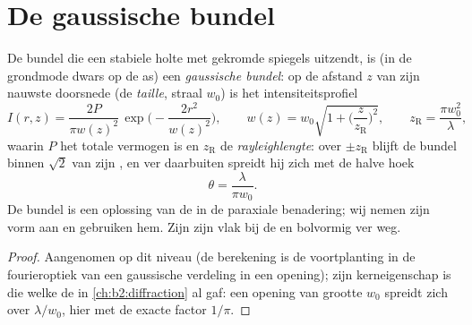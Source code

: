 \section{De gaussische bundel}

\begin{proposition}\label{prop:b2:laser:gaussian}
De bundel die een stabiele holte met gekromde spiegels uitzendt, is (in de
grondmode dwars op de as) een \emph{gaussische bundel}: op de afstand $z$ van zijn nauwste doorsnede (de
\emph{taille}, straal $w_0$) is het
intensiteitsprofiel
\[
I(r,z) = \frac{2P}{\pi w(z)^2}\,\exp\Big(-\frac{2r^2}{w(z)^2}\Big),
\qquad
w(z) = w_0\sqrt{1 + \Big(\frac{z}{z_{\text{R}}}\Big)^2},
\qquad
z_{\text{R}} = \frac{\pi w_0^2}{\lambda},
\]
waarin $P$ het totale vermogen is en $z_{\text{R}}$ de
\emph{rayleighlengte}: over $\pm z_{\text{R}}$ blijft de bundel
binnen $\sqrt2$ van zijn , en ver daarbuiten spreidt hij zich met de
halve hoek
\[
\theta = \frac{\lambda}{\pi w_0} .
\]
De bundel is een oplossing van de  in de paraxiale
benadering; wij nemen zijn vorm aan en gebruiken hem. Zijn  zijn vlak bij
de  en bolvormig ver weg.
\end{proposition}

\begin{proof}
Aangenomen op dit niveau (de berekening is de voortplanting in de fourieroptiek
van een gaussische verdeling in een opening); zijn kerneigenschap is
die welke de  in \cref{ch:b2:diffraction} al gaf: een
opening van grootte $w_0$ spreidt zich over $\lambda/w_0$, hier met de exacte
factor $1/\pi$.
\end{proof}

